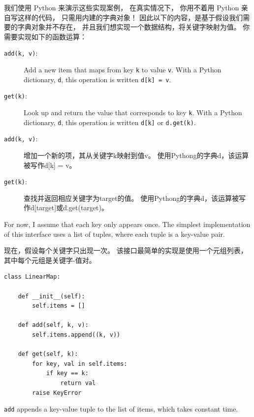 我们使用 Python 来演示这些实现案例， 在真实情况下，
你用不着用 Python 亲自写这样的代码， 只需用内建的字典对象！
因此以下的内容，是基于假设我们需要的字典对象并不存在，
并且我们想实现一个数据结构，将关键字映射为值。 你需要实现如下的函数运算：

\begin{description}

\item[{\tt add(k, v)}:] Add a new item that maps from key {\tt k}
to value {\tt v}.  With a Python dictionary, {\tt d}, this operation
is written {\tt d[k] = v}.

\item[{\tt get(k)}:] Look up and return the value that corresponds
to key {\tt k}.  With a Python dictionary, {\tt d}, this operation
is written {\tt d[k]} or {\tt d.get(k)}.

\end{description}

\begin{description}

\item [{\tt add(k, v)}:] 增加一个新的项，其从关键字k映射到值v。 使用Pythong的字典d，该运算被写作d[k] = v。

\item [{\tt get(k)}:] 查找并返回相应关键字为target的值。
 使用Pythong的字典d，该运算被写作d[target]或d.get(target)。

\end{description}

For now, I assume that each key only appears once.
The simplest implementation of this interface uses a list of
tuples, where each tuple is a key-value pair.

现在，假设每个关键字只出现一次。
该接口最简单的实现是使用一个元组列表， 其中每个元组是关键字-值对。

\begin{lstlisting}
class LinearMap:

    def __init__(self):
        self.items = []

    def add(self, k, v):
        self.items.append((k, v))

    def get(self, k):
        for key, val in self.items:
            if key == k:
                return val
        raise KeyError
\end{lstlisting}

{\tt add} appends a key-value tuple to the list of items, which
takes constant time.

